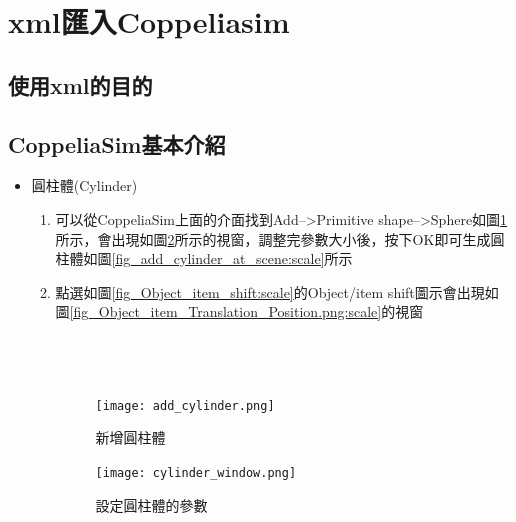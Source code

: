 \documentclass[14pt,a4paper]{report}  %
\newcommand{\fourteen}{\fontsize{14pt}{\baselineskip}\selectfont}%
\begin{document}
{    
    
      \section{xml匯入Coppeliasim}
      \subsection{使用xml的目的}
      {\begin{flushleft}
      \quad \quad \fourteen {在CoppeliaSim4.1的版本可以使用xml檔自動匯入stl的零件檔，並且可以從中去設定物體的大小、重量、從屬關係....等等的參數都可以用xml檔來做調整，目的是打算在CoppeliaSim做到直接匯入就能直接完成所有的流程，不過因為技術上的問題，我們使用半自動的方式來完成腳踏車避震系統的動態模擬。}
      \end{flushleft}
      \subsection{CoppeliaSim基本介紹}
      {\begin{flushleft}
      \quad \quad \fourteen {在CoppeliaSim裡有內建的物體(shape)和馬達(joint)，其中我們比較常用到的是立方體(Cuboid)和旋轉接頭馬達(Revolute joint)，以下我們會對這2種物件進行介紹。}
      \end{flushleft}
      \begin{itemize}
      \item 圓柱體(Cylinder)
      	\begin{enumerate}
      	\item{可以從CoppeliaSim上面的介面找到Add-->Primitive shape-->Sphere如圖\ref{fig_add_cylinder:scale}所示，會出現如圖\ref{fig_cylinder_window:scale}所示的視窗，調整完參數大小後，按下OK即可生成圓柱體如圖\ref{fig_add_cylinder_at_scene:scale}所示}
      \item{點選如圖\ref{fig_Object_item_shift:scale}的Object/item shift圖示會出現如圖\ref{fig_Object_item_Translation_Position.png:scale}的視窗}\\\\\\\\



      \begin{figure}[hbt!]
        \centering
        \texttt{[image: add\_cylinder.png]} 
        \caption{新增圓柱體}
        \label{fig_add_cylinder:scale}
      \end{figure}
      
      \begin{figure}[hbt!]
        \centering
        \texttt{[image: cylinder\_window.png]} 
        \caption{設定圓柱體的參數}
        \label{fig_cylinder_window:scale}
      \end{figure}
      

\end{enumerate}
\end{itemize}}}}
\end{document}

